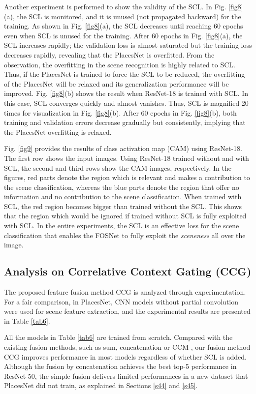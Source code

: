 \documentclass[journal,comsoc]{IEEEtran}
\begin{document}
Another experiment is performed to show the validity of the SCL. In Fig. \ref{fig8}(a), the SCL is monitored, and it is unused (not propagated backward) for the training. As shown in Fig. \ref{fig8}(a), the SCL decreases until reaching 60 epochs even when SCL is unused for the training. After 60 epochs in Fig. \ref{fig8}(a), the SCL increases rapidly; the validation loss is almost saturated but the training loss decreases rapidly, revealing that the PlacesNet is overfitted. From the observation, the overfitting in the scene recognition is highly related to SCL. Thus, if the PlacesNet is trained to force the SCL to be reduced, the overfitting of the PlacesNet will be relaxed and its generalization performance will be improved. Fig. \ref{fig8}(b) shows the result when ResNet-18 is trained with SCL. In this case, SCL converges quickly and almost vanishes. Thus, SCL is magnified 20 times for visualization in Fig. \ref{fig8}(b). After 60 epochs in Fig. \ref{fig8}(b), both training and validation errors decrease gradually but consistently, implying that the PlacesNet overfitting is relaxed.

Fig. \ref{fig9} provides the results of class activation map (CAM) \cite{b25} using ResNet-18. The first row shows the input images. Using ResNet-18 trained without and with SCL, the second and third rows show the CAM images, respectively. In the figures, red parts denote the region which is relevant and makes a contribution to the scene classification, whereas the blue parts denote the region that offer no information and no contribution to the scene classification. When trained with SCL, the red region becomes bigger than trained without the SCL. This shows that the region which would be ignored if trained without SCL is fully exploited with SCL. In the entire experiments, the SCL is an effective loss for the scene classification that enables the FOSNet to fully exploit the \textit{sceneness} all over the image.



\subsection{Analysis on Correlative Context Gating (CCG)}
\label{s52}
The proposed feature fusion method CCG is analyzed through experimentation. For a fair comparison, in PlacesNet, CNN models without partial convolution were used for scene feature extraction, and the experimental results are presented in Table \ref{tab6}.

All the models in Table \ref{tab6} are trained from scratch. Compared with the existing fusion methods, such as sum, concatenation or CCM \cite{b21}, our fusion method CCG improves performance in most models regardless of whether SCL is added. Although the fusion by concatenation achieves the best top-5 performance in ResNet-50, the simple fusion delivers limited performances in a new dataset that PlacesNet did not train, as explained in Sections \ref{s44} and \ref{s45}.
\end{document}

